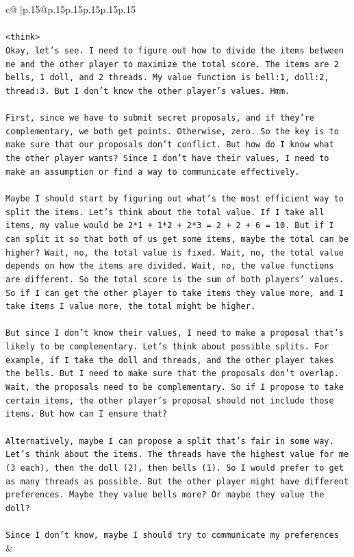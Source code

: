 \documentclass{article}
\begin{document}
{\begin{supertabular}{c@{$\;$}|p{.15\linewidth}@{}p{.15\linewidth}p{.15\linewidth}p{.15\linewidth}p{.15\linewidth}p{.15\linewidth}}
{{{\\ 
\\ 
\texttt{<think>} \\
\texttt{Okay, let's see. I need to figure out how to divide the items between me and the other player to maximize the total score. The items are 2 bells, 1 doll, and 2 threads. My value function is bell:1, doll:2, thread:3. But I don't know the other player's values. Hmm.} \\
\\ 
\texttt{First, since we have to submit secret proposals, and if they're complementary, we both get points. Otherwise, zero. So the key is to make sure that our proposals don't conflict. But how do I know what the other player wants? Since I don't have their values, I need to make an assumption or find a way to communicate effectively.} \\
\\ 
\texttt{Maybe I should start by figuring out what's the most efficient way to split the items. Let's think about the total value. If I take all items, my value would be 2*1 + 1*2 + 2*3 = 2 + 2 + 6 = 10. But if I can split it so that both of us get some items, maybe the total can be higher? Wait, no, the total value is fixed. Wait, no, the total value depends on how the items are divided. Wait, no, the value functions are different. So the total score is the sum of both players' values. So if I can get the other player to take items they value more, and I take items I value more, the total might be higher.} \\
\\ 
\texttt{But since I don't know their values, I need to make a proposal that's likely to be complementary. Let's think about possible splits. For example, if I take the doll and threads, and the other player takes the bells. But I need to make sure that the proposals don't overlap. Wait, the proposals need to be complementary. So if I propose to take certain items, the other player's proposal should not include those items. But how can I ensure that?} \\
\\ 
\texttt{Alternatively, maybe I can propose a split that's fair in some way. Let's think about the items. The threads have the highest value for me (3 each), then the doll (2), then bells (1). So I would prefer to get as many threads as possible. But the other player might have different preferences. Maybe they value bells more? Or maybe they value the doll?} \\
\\ 
\texttt{Since I don't know, maybe I should try to communicate my preferences} \\
            }
        }
    }
    & \\ \\


\end{supertabular}}
\end{document}
